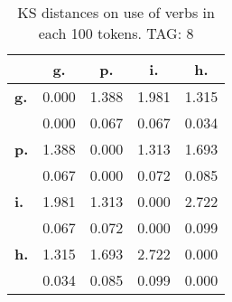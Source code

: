 \begin{table}[h!]
\begin{center}
\begin{tabular}{| l || c | c | c | c |}\hline
 & {\bf g.} & {\bf p.} & {\bf i.} & {\bf h.} \\\hline\hline
{\bf g.} & 0.000 & 1.388 & 1.981 & 1.315 \\
{\bf } & 0.000 & 0.067 & 0.067 & 0.034 \\\hline
{\bf p.} & 1.388 & 0.000 & 1.313 & 1.693 \\
{\bf } & 0.067 & 0.000 & 0.072 & 0.085 \\\hline
{\bf i.} & 1.981 & 1.313 & 0.000 & 2.722 \\
{\bf } & 0.067 & 0.072 & 0.000 & 0.099 \\\hline
{\bf h.} & 1.315 & 1.693 & 2.722 & 0.000 \\
{\bf } & 0.034 & 0.085 & 0.099 & 0.000 \\\hline
\end{tabular}
\caption{KS distances on use of verbs in each 100 tokens. TAG: 8}
\end{center}
\end{table}